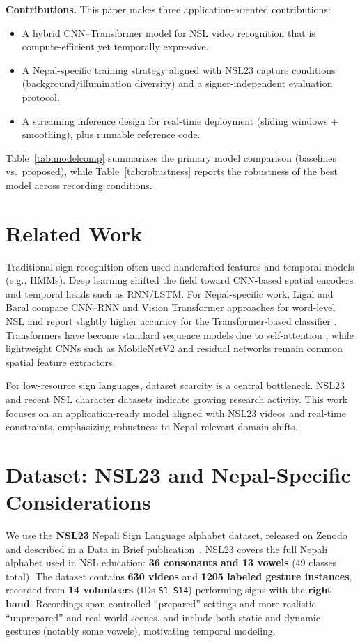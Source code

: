 \documentclass[conference]{IEEEtran}
\begin{document}
\textbf{Contributions.} This paper makes three application-oriented contributions:
\begin{itemize}
  \item A hybrid CNN--Transformer model for NSL video recognition that is compute-efficient yet temporally expressive.
  \item A Nepal-specific training strategy aligned with NSL23 capture conditions (background/illumination diversity) and a signer-independent evaluation protocol.
  \item A streaming inference design for real-time deployment (sliding windows + smoothing), plus runnable reference code.
\end{itemize}

Table~\ref{tab:modelcomp} summarizes the primary model comparison (baselines vs.\ proposed), while Table~\ref{tab:robustness} reports the robustness of the best model across recording conditions.

\section{Related Work}
Traditional sign recognition often used handcrafted features and temporal models (e.g., HMMs). Deep learning shifted the field toward CNN-based spatial encoders and temporal heads such as RNN/LSTM. For Nepal-specific work, Ligal and Baral compare CNN--RNN and Vision Transformer approaches for word-level NSL and report slightly higher accuracy for the Transformer-based classifier \cite{ligal2022ioegc}. Transformers have become standard sequence models due to self-attention \cite{vaswani2017attention}, while lightweight CNNs such as MobileNetV2 \cite{sandler2018mobilenetv2} and residual networks \cite{he2016resnet} remain common spatial feature extractors.

For low-resource sign languages, dataset scarcity is a central bottleneck. NSL23 \cite{sunuwar2024dib,zenodo_nsl23} and recent NSL character datasets \cite{poudel2025arxiv} indicate growing research activity. This work focuses on an application-ready model aligned with NSL23 videos and real-time constraints, emphasizing robustness to Nepal-relevant domain shifts.

\section{Dataset: NSL23 and Nepal-Specific Considerations}
We use the \textbf{NSL23} Nepali Sign Language alphabet dataset, released on Zenodo and described in a Data in Brief publication~\cite{zenodo_nsl23,sunuwar2024dib}. NSL23 covers the full Nepali alphabet used in NSL education: \textbf{36 consonants and 13 vowels} (49 classes total). The dataset contains \textbf{630 videos} and \textbf{1205 labeled gesture instances}, recorded from \textbf{14 volunteers} (IDs \texttt{S1}--\texttt{S14}) performing signs with the \textbf{right hand}. Recordings span controlled ``prepared'' settings and more realistic ``unprepared'' and real-world scenes, and include both static and dynamic gestures (notably some vowels), motivating temporal modeling.
\end{document}
